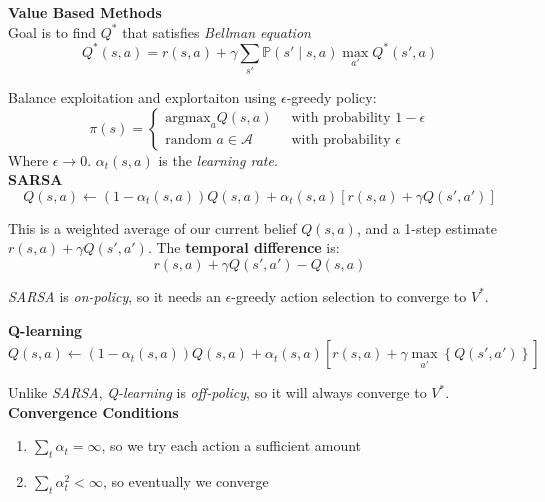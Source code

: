 \documentclass[10pt,landscape]{article}
\newcommand{\p}{\mathbb{P}}
\begin{document}
\begin{multicols*}{3}
	\textbf{Value Based Methods}\\

	Goal is to find $Q^{*}$ that satisfies \textit{Bellman equation}
	$$Q^{*}(s, a) = r(s, a) + \gamma \sum_{s'} \p(s' \mid s, a) \max_{a'} Q^{*}(s', a)$$

	Balance exploitation and explortaiton using $\epsilon$-greedy policy:
	$$\pi(s) = \begin{cases} \text{argmax}_{a} Q(s, a) & \ \text{ with probability } 1 - \epsilon \\ \text{random } a \in \mathcal{A} & \ \text{ with probability } \epsilon \end{cases}$$
	Where $\epsilon \to 0$.
	$\alpha_{t}(s, a)$ is the \textit{learning rate}.\\
	\smallskip
	\textbf{SARSA}
	$$Q(s, a) \leftarrow (1 - \alpha_{t}(s, a)) Q(s, a) + \alpha_{t}(s, a)[r(s, a) + \gamma Q(s', a')]$$

	This is a weighted average of our current belief $Q(s, a)$, and a 1-step estimate $r(s, a) + \gamma Q(s', a')$. The \textbf{temporal difference} is:
	$$r(s, a) + \gamma Q(s', a') - Q(s, a)$$

	\textit{SARSA} is \textit{on-policy}, so it needs an $\epsilon$-greedy action selection to converge to $V^{*}$.\\
	\smallskip

	\textbf{Q-learning}
	$$Q(s, a) \leftarrow (1 - \alpha_{t}(s, a)) Q(s, a) + \alpha_{t}(s, a)[r(s, a) + \gamma \max_{a'}\left\{Q(s', a')\right\}] $$

	Unlike \textit{SARSA}, \textit{Q-learning} is \textit{off-policy}, so it will always converge to $V^{*}$.\\
	\smallskip
	\textbf{Convergence Conditions}\\
	\begin{enumerate}
		\item $\sum_{t} \alpha_{t} = \infty$, so we try each action a sufficient amount
		\item $\sum_{t} \alpha_{t}^{2} < \infty$, so eventually we converge
	\end{enumerate}

\end{multicols*}
\end{document}
